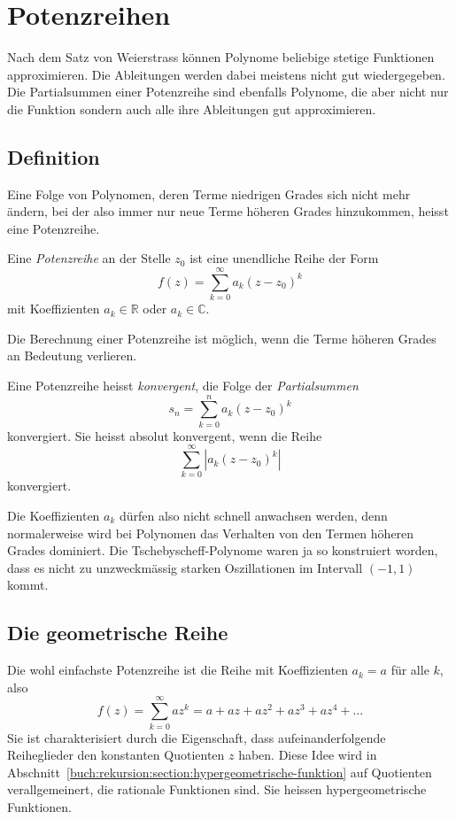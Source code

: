 %
%
%
\section{Potenzreihen
\label{buch:potenzen:section:potenzreihen}}
Nach dem Satz von Weierstrass können
Polynome beliebige stetige Funktionen approximieren.
Die Ableitungen werden dabei meistens nicht gut wiedergegeben.
Die Partialsummen einer Potenzreihe sind ebenfalls Polynome,
die aber nicht nur die Funktion sondern auch alle ihre Ableitungen
gut approximieren.

%
%
\subsection{Definition
\label{buch:potenzen:potenzreihen:section:definition}}
Eine Folge von Polynomen, deren Terme niedrigen Grades sich nicht
mehr ändern, bei der also immer nur neue Terme höheren Grades
hinzukommen, heisst eine Potenzreihe.

\begin{definition}
\label{buch:polynome:def:potenzreihe}
%
Eine {\em Potenzreihe} an der Stelle $z_0$ ist eine unendliche Reihe
der Form
\[
f(z)
=
\sum_{k=0}^\infty a_k (z-z_0)^k
\]
mit Koeffizienten $a_k\in \mathbb{R}$ oder $a_k\in\mathbb{C}$.
\end{definition}

Die Berechnung einer Potenzreihe ist möglich, wenn die Terme höheren
Grades an Bedeutung verlieren.

\begin{definition}
%
%
Eine Potenzreihe heisst {\em konvergent}, die Folge der {\em Partialsummen}
\[
s_n = \sum_{k=0}^n a_k(z-z_0)^k
\]
konvergiert.
Sie heisst absolut konvergent, wenn die Reihe
\[
\sum_{k=0}^\infty |a_k (z-z_0)^k|
\]
konvergiert.
\end{definition}

Die Koeffizienten $a_k$ dürfen also nicht schnell anwachsen
werden, denn normalerweise wird bei Polynomen das Verhalten von den
Termen höheren Grades dominiert.
Die Tschebyscheff-Polynome waren ja so konstruiert worden, dass
es nicht zu unzweckmässig starken Oszillationen im Intervall $(-1,1)$
kommt.

%
%
\subsection{Die geometrische Reihe
\label{buch:potenzen:potenzreihen:section:geometrische}}
Die wohl einfachste Potenzreihe ist die Reihe mit Koeffizienten
$a_k=a$ für alle $k$, also
\[
f(z)
=
\sum_{k=0}^\infty az^k
=
a+az+az^2+az^3+az^4+\dots
\]
Sie ist charakterisiert durch die Eigenschaft, dass aufeinanderfolgende
Reiheglieder den konstanten Quotienten $z$ haben.
Diese Idee wird
in Abschnitt~\ref{buch:rekursion:section:hypergeometrische-funktion}
auf Quotienten verallgemeinert, die rationale Funktionen sind.
Sie heissen hypergeometrische Funktionen.
%

